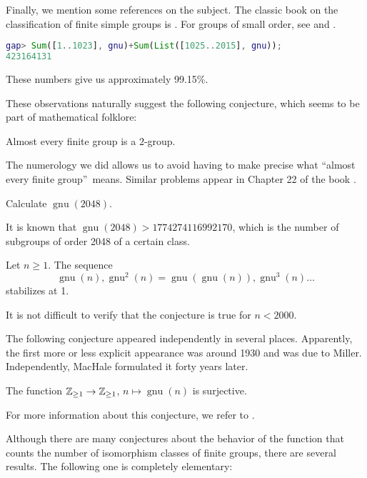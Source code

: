 Finally, we mention some references on the subject. The classic book on the classification of finite simple groups is \cite{MR1915964}. For groups of small order, see \cite{MR1250465} and \cite{MR1357169}.

\begin{lstlisting}[language=gap]
gap> Sum([1..1023], gnu)+Sum(List([1025..2015], gnu));
423164131
\end{lstlisting}

These numbers give us approximately 99.15\%.

These observations naturally suggest the following conjecture, which seems to be part of mathematical folklore:

\begin{conjecture}
Almost every finite group is a $2$-group.
\end{conjecture}

The numerology we did allows us to avoid having to make precise what \textquotedblleft almost every finite group\textquotedblright\ means. Similar problems appear in Chapter 22 of the book \cite{MR2382539}.

\begin{problem}
Calculate $\operatorname{gnu}(2048)$.
\end{problem}

It is known that $\operatorname{gnu}(2048)>1774274116992170$, which is the number of subgroups of order 2048 of a certain class.

\begin{conjecture}
Let $n\geq1$. The sequence
\[
\operatorname{gnu}(n),\operatorname{gnu}^2(n)=\operatorname{gnu}(\operatorname{gnu}(n)),\operatorname{gnu}^3(n)\dots
\]
stabilizes at 1.
\end{conjecture}

It is not difficult to verify that the conjecture is true for $n<2000$.

The following conjecture appeared independently in several places. Apparently, the first more or less explicit appearance was around 1930 and was due to Miller. Independently, MacHale formulated it forty years later.

\begin{conjecture}
The function $\mathbb{Z}_{\geq1}\to\mathbb{Z}_{\geq1}$, 
$n\mapsto\operatorname{gnu}(n)$ is surjective.
\end{conjecture}

For more information about this conjecture, we refer to \cite[\S21.6]{MR2382539}.

Although there are many conjectures about the behavior of the function that counts the number of isomorphism classes of finite groups, there are several results. The following one is completely elementary:

